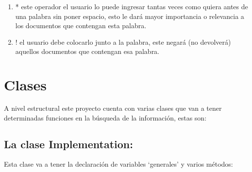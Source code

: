 \documentclass[a4paper,12pt]{article}
\begin{document}
\renewcommand{\theenumi}{\Roman{enumi}}
\begin{enumerate}
	\item * este operador el usuario lo puede ingresar tantas veces como quiera antes de una palabra sin poner espacio, esto le dará mayor importancia o relevancia a los documentos que contengan esta palabra.
    \item ! el usuario debe colocarlo junto a la palabra, este negará (no devolverá) aquellos documentos que contengan esa palabra.\\
\end{enumerate}



\section{Clases}

A nivel estructural este proyecto cuenta con varias clases que van a tener determinadas funciones en la búsqueda de la información, estas son:


\subsection{La clase Implementation:}

	Esta clase va a tener la declaración de variables ‘generales’ y varios métodos:
	\renewcommand{\theenumi}{\arabic{enumi}}
	
\end{document}
